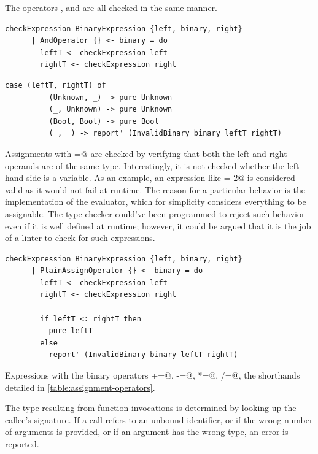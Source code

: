 \documentclass[UdineBachThesis,american,11pt]{PhdThesis}
\begin{document}
  The operators \lstinline@and@, \lstinline@or@ and \lstinline@xor@ are all
  checked in the same manner.

  \begin{lstlisting}[gobble=4,basicstyle=\ttfamily\small]
    checkExpression BinaryExpression {left, binary, right}
      | AndOperator {} <- binary = do
        leftT <- checkExpression left
        rightT <- checkExpression right
  \end{lstlisting}

  \newpage

  \begin{lstlisting}[gobble=4,basicstyle=\ttfamily\small]
        case (leftT, rightT) of
          (Unknown, _) -> pure Unknown
          (_, Unknown) -> pure Unknown
          (Bool, Bool) -> pure Bool
          (_, _) -> report' (InvalidBinary binary leftT rightT)
  \end{lstlisting}

  Assignments with \lstinline@=@ are checked by verifying that both the left and
  right operands are of the same type. Interestingly, it is not checked whether
  the left-hand side is a variable. As an example, an expression like
   = 2@ is considered valid as it would not fail at runtime. The
  reason for a particular behavior is the implementation of the evaluator, which
  for simplicity considers everything to be assignable. The type checker
  could've been programmed to reject such behavior even if it is well defined at
  runtime; however, it could be argued that it is the job of a linter to check
  for such expressions.

  \begin{lstlisting}[gobble=4,basicstyle=\ttfamily\small]
    checkExpression BinaryExpression {left, binary, right}
      | PlainAssignOperator {} <- binary = do
        leftT <- checkExpression left
        rightT <- checkExpression right

        if leftT <: rightT then
          pure leftT
        else
          report' (InvalidBinary binary leftT rightT)
  \end{lstlisting}

  Expressions with the binary operators \lstinline@+=@, \lstinline@-=@,
  \lstinline@*=@, \lstinline@/=@, \lstinline@%=@ are type checked considering
  the shorthands detailed in \autoref{table:assignment-operators}.

  The type resulting from function invocations is determined by looking up the
  callee's signature. If a call refers to an unbound identifier, or if the wrong
  number of arguments is provided, or if an argument has the wrong type, an
  error is reported.
\end{document}
